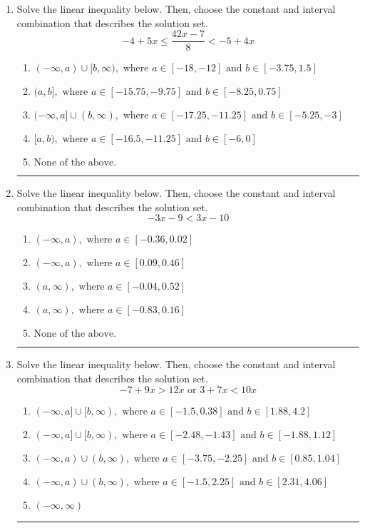 \documentclass[14pt]{extbook}
\newcommand{\litem}[1]{\item#1\hspace*{-1cm}\rule{\textwidth}{0.4pt}}
\begin{document}
\begin{enumerate}
{\begin{enumerate}[label=\Alph*.]
\end{enumerate} }
\litem{
Solve the linear inequality below. Then, choose the constant and interval combination that describes the solution set.\[ -4 + 5 x \leq \frac{42 x - 7}{8} < -5 + 4 x \]\begin{enumerate}[label=\Alph*.]
\item \( (-\infty, a) \cup [b, \infty), \text{ where } a \in [-18, -12] \text{ and } b \in [-3.75, 1.5] \)
\item \( (a, b], \text{ where } a \in [-15.75, -9.75] \text{ and } b \in [-8.25, 0.75] \)
\item \( (-\infty, a] \cup (b, \infty), \text{ where } a \in [-17.25, -11.25] \text{ and } b \in [-5.25, -3] \)
\item \( [a, b), \text{ where } a \in [-16.5, -11.25] \text{ and } b \in [-6, 0] \)
\item \( \text{None of the above.} \)

\end{enumerate} }
\litem{
Solve the linear inequality below. Then, choose the constant and interval combination that describes the solution set.\[ -3x -9 < 3x -10 \]\begin{enumerate}[label=\Alph*.]
\item \( (-\infty, a), \text{ where } a \in [-0.36, 0.02] \)
\item \( (-\infty, a), \text{ where } a \in [0.09, 0.46] \)
\item \( (a, \infty), \text{ where } a \in [-0.04, 0.52] \)
\item \( (a, \infty), \text{ where } a \in [-0.83, 0.16] \)
\item \( \text{None of the above}. \)

\end{enumerate} }
\litem{
Solve the linear inequality below. Then, choose the constant and interval combination that describes the solution set.\[ -7 + 9 x > 12 x \text{ or } 3 + 7 x < 10 x \]\begin{enumerate}[label=\Alph*.]
\item \( (-\infty, a] \cup [b, \infty), \text{ where } a \in [-1.5, 0.38] \text{ and } b \in [1.88, 4.2] \)
\item \( (-\infty, a] \cup [b, \infty), \text{ where } a \in [-2.48, -1.43] \text{ and } b \in [-1.88, 1.12] \)
\item \( (-\infty, a) \cup (b, \infty), \text{ where } a \in [-3.75, -2.25] \text{ and } b \in [0.85, 1.04] \)
\item \( (-\infty, a) \cup (b, \infty), \text{ where } a \in [-1.5, 2.25] \text{ and } b \in [2.31, 4.06] \)
\item \( (-\infty, \infty) \)


\end{enumerate}}
\end{enumerate}
\end{document}
